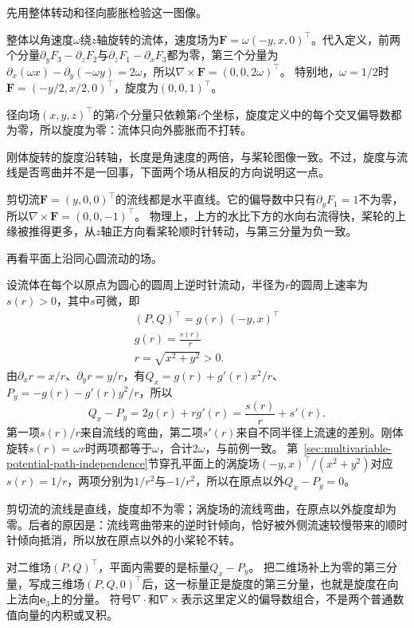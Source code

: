 先用整体转动和径向膨胀检验这一图像。
\begin{example}[刚体旋转与径向膨胀的旋度]
\label{ex:analysis-rigid-rotation-curl}
整体以角速度$\omega$绕$z$轴旋转的流体，速度场为$\bm F=\omega(-y,x,0)^\top$。代入定义，前两个分量$\partial_yF_3-\partial_zF_2$与$\partial_zF_1-\partial_xF_3$都为零，第三个分量为$\partial_x(\omega x)-\partial_y(-\omega y)=2\omega$，所以$\nabla\times\bm F=(0,0,2\omega)^\top$。
特别地，$\omega=1/2$时$\bm F=(-y/2,x/2,0)^\top$，旋度为$(0,0,1)^\top$。

径向场$(x,y,z)^\top$的第$i$个分量只依赖第$i$个坐标，旋度定义中的每个交叉偏导数都为零，所以旋度为零：流体只向外膨胀而不打转。
\end{example}
刚体旋转的旋度沿转轴，长度是角速度的两倍，与桨轮图像一致。不过，旋度与流线是否弯曲并不是一回事，下面两个场从相反的方向说明这一点。
\begin{example}[剪切流与涡旋场]
剪切流$\bm F=(y,0,0)^\top$的流线都是水平直线。它的偏导数中只有$\partial_yF_1=1$不为零，所以$\nabla\times\bm F=(0,0,-1)^\top$。
物理上，上方的水比下方的水向右流得快，桨轮的上缘被推得更多，从$z$轴正方向看桨轮顺时针转动，与第三分量为负一致。

再看平面上沿同心圆流动的场。

设流体在每个以原点为圆心的圆周上逆时针流动，半径为$r$的圆周上速率为$s(r)>0$，其中$s$可微，即
\[
 \begin{gathered}
(P,Q)^\top=g(r)\,(-y,x)^\top\\
g(r)=\frac{s(r)}r\\
r=\sqrt{x^2+y^2}>0.
 \end{gathered}
\]
由$\partial_xr=x/r$、$\partial_yr=y/r$，有$Q_x=g(r)+g'(r)x^2/r$、$P_y=-g(r)-g'(r)y^2/r$，所以
\[
 Q_x-P_y=2g(r)+rg'(r)=\frac{s(r)}r+s'(r).
\]
第一项$s(r)/r$来自流线的弯曲，第二项$s'(r)$来自不同半径上流速的差别。刚体旋转$s(r)=\omega r$时两项都等于$\omega$，合计$2\omega$，与前例一致。
第~\ref{sec:multivariable-potential-path-independence}节穿孔平面上的涡旋场$(-y,x)^\top/(x^2+y^2)$对应$s(r)=1/r$，两项分别为$1/r^2$与$-1/r^2$，所以在原点以外$Q_x-P_y=0$。
\end{example}
剪切流的流线是直线，旋度却不为零；涡旋场的流线弯曲，在原点以外旋度却为零。后者的原因是：流线弯曲带来的逆时针倾向，恰好被外侧流速较慢带来的顺时针倾向抵消，所以放在原点以外的小桨轮不转。

对二维场$(P,Q)^\top$，平面内需要的是标量$Q_x-P_y$。
把二维场补上为零的第三分量，写成三维场$(P,Q,0)^\top$后，这一标量正是旋度的第三分量，也就是旋度在向上法向$\bm e_3$上的分量。
符号$\nabla\mathbin\cdot$和$\nabla\times$表示这里定义的偏导数组合，不是两个普通数值向量的内积或叉积。


